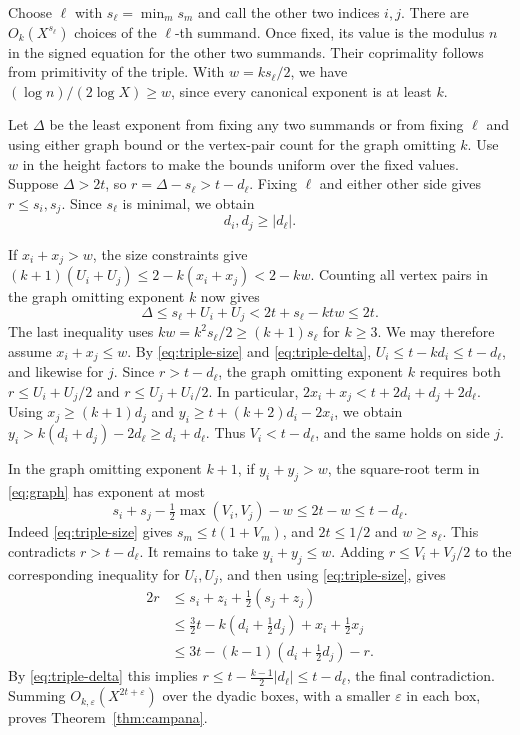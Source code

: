 \documentclass[11pt,reqno]{amsart}
\newcommand{\eps}{\varepsilon}
\begin{document}
Choose \(\ell\) with \(s_\ell=\min_m s_m\) and call the other two
indices \(i,j\). There are \(O_k(X^{s_\ell})\) choices of the
\(\ell\)-th summand. Once fixed, its value is the modulus \(n\)
in the signed equation for the other two summands. Their coprimality
follows from primitivity of the triple. With \(w=k s_\ell/2\),
we have \((\log n)/(2\log X)\ge w\), since every canonical exponent
is at least \(k\).

Let \(\Delta\) be the least exponent from fixing any two summands
or from fixing \(\ell\) and using either graph bound or the vertex-pair
count for the graph omitting \(k\). Use \(w\) in the height factors
to make the bounds uniform over the fixed values. Suppose \(\Delta>2t\),
so \(r=\Delta-s_\ell>t-d_\ell\). Fixing \(\ell\) and either other side
gives \(r\le s_i,s_j\). Since \(s_\ell\) is minimal, we obtain
\begin{equation}\label{eq:triple-delta}
                         d_i,d_j\ge |d_\ell|.
\end{equation}

If \(x_i+x_j>w\), the size constraints give
\((k+1)(U_i+U_j)\le 2-k(x_i+x_j)<2-kw\).
Counting all vertex pairs in the graph omitting exponent \(k\)
now gives
\[
             \Delta\le s_\ell+U_i+U_j
                    <2t+s_\ell-ktw\le 2t .
\]
The last inequality uses \(kw=k^2s_\ell/2\ge(k+1)s_\ell\)
for \(k\ge3\).
We may therefore assume \(x_i+x_j\le w\).
By \eqref{eq:triple-size} and \eqref{eq:triple-delta},
\(U_i\le t-kd_i\le t-d_\ell\), and likewise for \(j\).
Since \(r>t-d_\ell\), the graph omitting exponent \(k\) requires both
\(r\le U_i+U_j/2\) and \(r\le U_j+U_i/2\). In particular,
\(2x_i+x_j<t+2d_i+d_j+2d_\ell\). Using \(x_j\ge(k+1)d_j\) and
\(y_i\ge t+(k+2)d_i-2x_i\), we obtain
\(y_i>k(d_i+d_j)-2d_\ell\ge d_i+d_\ell\).
Thus \(V_i<t-d_\ell\), and the same holds on side \(j\).

In the graph omitting exponent \(k+1\), if \(y_i+y_j>w\), the
square-root term in \eqref{eq:graph} has exponent at most
\[
 s_i+s_j-\tfrac12\max(V_i,V_j)-w \le 2t-w \le t-d_\ell .
\]
Indeed \eqref{eq:triple-size} gives \(s_m\le t(1+V_m)\), and
\(2t\le1/2\) and \(w\ge s_\ell\). This contradicts \(r>t-d_\ell\).
It remains to take \(y_i+y_j\le w\). Adding \(r\le V_i+V_j/2\)
to the corresponding inequality for \(U_i,U_j\), and then using
\eqref{eq:triple-size}, gives
\[
\begin{aligned}
 2r &\le s_i+z_i+\tfrac12(s_j+z_j)\\
    &\le \tfrac32t-k(d_i+\tfrac12d_j)+x_i+\tfrac12x_j\\
    &\le 3t-(k-1)(d_i+\tfrac12d_j)-r .
\end{aligned}
\]
By \eqref{eq:triple-delta} this implies
\(r\le t-\tfrac{k-1}{2}|d_\ell|\le t-d_\ell\), the final contradiction.
Summing \(O_{k,\eps}(X^{2t+\eps})\) over the dyadic boxes, with a
smaller \(\eps\) in each box, proves Theorem~\ref{thm:campana}.
\end{document}
